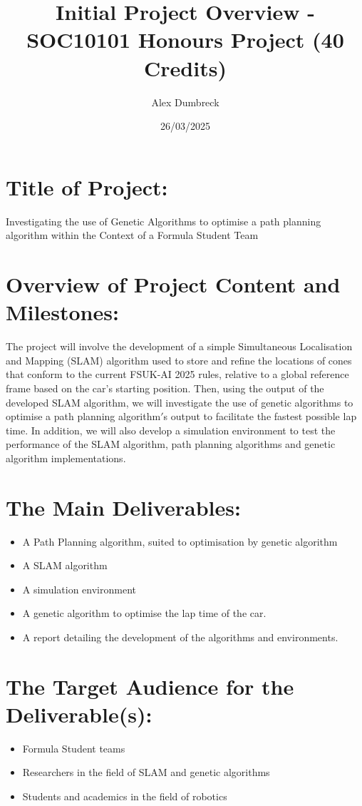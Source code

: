 \documentclass[11pt]{article}
\title{Initial Project Overview - SOC10101 Honours Project (40 Credits)}
\author{Alex Dumbreck}
\date{26/03/2025}
\begin{document}
    \maketitle
    \section*{Title of Project:}
    Investigating the use of Genetic Algorithms to optimise a path planning algorithm within the Context of a Formula Student Team

    \section*{Overview of Project Content and Milestones:}
    The project will involve the development of a simple Simultaneous Localisation and Mapping (SLAM) algorithm\cite{LeLargeBiederLauer2021} used to store and refine the locations of cones that conform to the current FSUK-AI 2025 rules\cite{FSUKAIRules2025}, relative to a global reference frame based on the car's starting position.
    Then, using the output of the developed SLAM algorithm, we will investigate the use of genetic algorithms to optimise a path planning algorithm\cite{HarperEvolutionary}\('\)s output to facilitate the fastest possible lap time.
    In addition, we will also develop a simulation environment\cite{platt2022comparative} to test the performance of the SLAM algorithm, path planning algorithms and genetic algorithm implementations.

    \section*{The Main Deliverables:}
    \begin{itemize}
        \item A Path Planning algorithm, suited to optimisation by genetic algorithm
        \item A SLAM algorithm
        \item A simulation environment
        \item A genetic algorithm to optimise the lap time of the car.
        \item A report detailing the development of the algorithms and environments.
    \end{itemize}

    \section*{The Target Audience for the Deliverable(s):}
    \begin{itemize}
        \item Formula Student teams
        \item Researchers in the field of SLAM and genetic algorithms
        \item Students and academics in the field of robotics
    \end{itemize}
\end{document}

